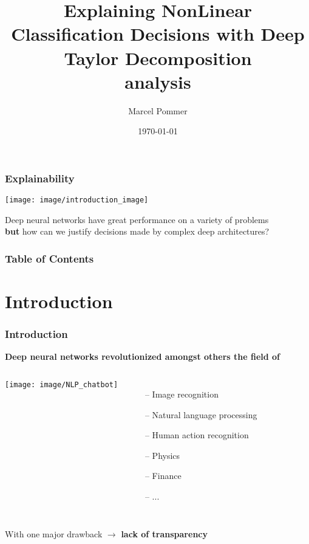 \documentclass{beamer}
\begin{document}
\title[Deep Taylor Decomposition]{Explaining NonLinear Classification Decisions with Deep Taylor Decomposition\\
analysis}  
\author{Marcel Pommer}
\date{\today} 

\begin{frame}
\titlepage
\end{frame} 

\begin{frame}
\frametitle[Explainability]{Explainability}
\begin{center}
\texttt{[image: image/introduction\_image]}
\end{center}
\vspace{0.25cm}
Deep neural networks have great performance on a variety of problems \\
\textbf{but} how can we justify decisions made by complex deep architectures?\\
\end{frame} 


\begin{frame}
\frametitle[Table of Contents]{Table of Contents}
\vspace{0.4cm}
\tableofcontents
\end{frame} 



\section[Introduction]{Introduction}
\begin{frame}
\frametitle{Introduction} 
\textbf{Deep neural networks revolutionized amongst others the field of}\\
\vspace{0.25cm}
       \begin{columns}[T]
             \centering
             \texttt{[image: image/NLP\_chatbot]}
			\begin{itemize}
			\item[--] Image recognition
			\item[--] Natural language processing
			\item[--] Human action recognition
			\item[--] Physics
			\item[--] Finance
			\item[--] ...
			\end{itemize}
         \end{columns} 
\vspace{0.5cm}
With one major drawback $\rightarrow$ \textbf{lack of transparency}
\end{frame}
\end{document}

